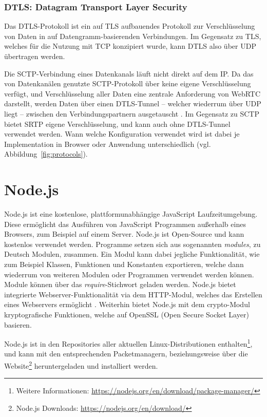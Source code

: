 \subsubsection{DTLS: Datagram Transport Layer Security}
Das \acf{DTLS}-Protokoll ist ein auf \acf{TLS} aufbauendes Protokoll zur Verschlüsselung von Daten in auf Datengramm-basierenden Verbindungen. Im Gegensatz zu \acs{TLS}, welches für die Nutzung mit \acs{TCP} konzipiert wurde, kann \acs{DTLS} also über \acs{UDP} übertragen werden.\par

Die \acs{SCTP}-Verbindung eines Datenkanals läuft nicht direkt auf dem \acf{IP}. Da das von Datenkanälen genutzte \acs{SCTP}-Protokoll über keine eigene Verschlüsselung verfügt, und Verschlüsselung aller Daten eine zentrale Anforderung von \acs{WebRTC} darstellt, werden Daten über einen \acs{DTLS}-Tunnel -- welcher wiederrum über \acs{UDP} liegt -- zwischen den Verbindungspartnern ausgetauscht \cite{rtcsecurity}. Im Gegensatz zu \acs{SCTP} bietet \acs{SRTP} eigene Verschlüsselung, und kann auch ohne \acs{DTLS}-Tunnel verwendet werden. Wann welche Konfiguration verwendet wird ist dabei je Implementation in Browser oder Anwendung unterschiedlich (vgl. Abbildung~\ref{fig:protocols}).

\section{Node.js}
Node.js ist eine kostenlose, plattformunabhängige JavaScript Laufzeitumgebung.
Diese ermöglicht das Ausführen von JavaScript Programmen außerhalb eines Browsers, zum Beispiel auf einem Server. Node.js ist Open-Source und kann kostenlos verwendet werden. Programme setzen sich aus sogenannten \textit{modules}, zu Deutsch Modulen, zusammen. Ein Modul kann dabei jegliche Funktionalität, wie zum Beispiel Klassen, Funktionen und Konstanten exportieren, welche dann wiederrum von weiteren Modulen oder Programmen verwendet werden können. Module können über das \textit{require}-Stichwort geladen werden. Node.js bietet integrierte Webserver-Funktionalität via dem \acf{HTTP}-Modul, welches das Erstellen eines Webservers ermöglicht \cite{nodejs}. Weiterhin bietet Node.js mit dem \glqq{}crypto\grqq{}-Modul kryptografische Funktionen, welche auf OpenSSL (Open Secure Socket Layer) basieren.\par 

Node.js ist in den Repositories aller aktuellen Linux-Distributionen enthalten\footnote{Weitere Informationen: \url{https://nodejs.org/en/download/package-manager/}}, und kann mit den entsprechenden Packetmanagern, beziehungsweise über die Website\footnote{Node.js Downloads: \url{https://nodejs.org/en/download/}} heruntergeladen und installiert werden.\par

